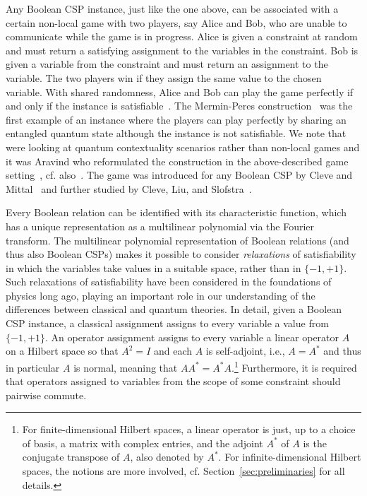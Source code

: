 Any Boolean CSP instance, just like the one above, can be associated with a certain non-local game with two
players, say Alice and Bob, who are unable to communicate while the game is in
progress. Alice is given a constraint at
random and must return a satisfying assignment to the variables in the
constraint. Bob is given a variable from the constraint and must return an
assignment to the variable. The two players win if they assign the same value to
the chosen variable. With shared randomness, Alice and Bob can play the game
perfectly if and only if the instance is satisfiable~\cite{Cleve14:icalp}.
%
The Mermin-Peres
construction~\cite{Mermin1990simple,Peres1990incompatible}
was the first example of an instance where the players can play perfectly by
sharing an entangled quantum state although the instance is not satisfiable. We
note that~\cite{Mermin1990simple,Peres1990incompatible} were looking at quantum contextuality scenarios rather than
non-local games and it was Aravind who reformulated the construction in the above-described
game setting~\cite{aravind2002bell}, cf. also~\cite{Cleve04:ccc}. The game was introduced for any Boolean
CSP by Cleve and Mittal~\cite{Cleve14:icalp}
and further studied by Cleve, Liu, and Slofstra~\cite{Cleve17:jmp-perfect}.

Every Boolean relation can be identified with its characteristic function, which
has a unique representation as a multilinear polynomial via the Fourier
transform. The multilinear polynomial representation of Boolean relations (and
thus also Boolean CSPs) makes it possible to consider \emph{relaxations} of
satisfiability in which the variables take values in a suitable space,
rather than in $\{-1,+1\}$. Such relaxations of satisfiability have been
considered in the  foundations of physics long ago, playing an important role in
our understanding of the differences between classical and quantum theories.
%
In detail, given a Boolean CSP instance, a classical assignment assigns to every
variable a value from $\{-1,+1\}$. An operator assignment assigns to every
variable a linear operator $A$ on a Hilbert space so that $A^2=I$
and each $A$ is self-adjoint, i.e., $A=A^*$ and thus in particular $A$ is
normal, meaning that $AA^*=A^*A$.\footnote{For finite-dimensional Hilbert
spaces, a linear operator is just, up to a choice of basis, a matrix with
complex entries, and the adjoint $A^*$ of $A$ is the conjugate transpose of $A$,
also denoted by $A^*$. For
infinite-dimensional Hilbert spaces, the notions are more involved, cf.
Section~\ref{sec:preliminaries} for all details.}
Furthermore, it is required that operators
assigned to variables from the scope of some constraint should pairwise commute. 


